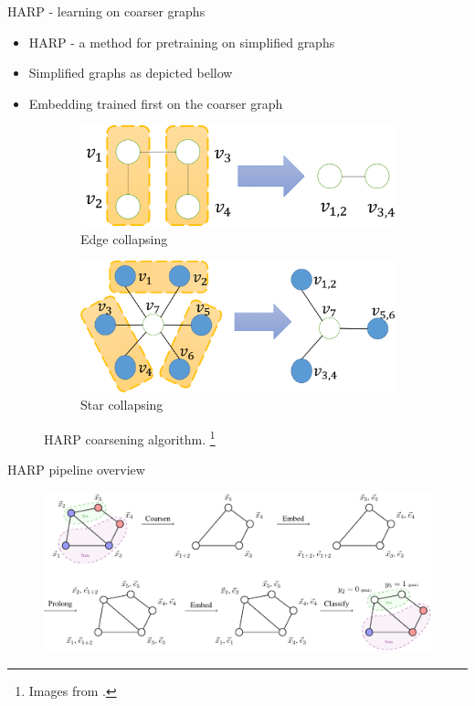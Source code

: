 \documentclass[10pt]{beamer}
\begin{document}
\begin{frame}{HARP - learning on coarser graphs}
	\begin{itemize}
		\item HARP - a method for pretraining on simplified graphs
		\item Simplified graphs as depicted bellow
		\item Embedding trained first on the coarser graph
	\end{itemize}
	\begin{figure}
		\centering
		\begin{subfigure}[t]{0.38\textwidth}
			\centering
			\includegraphics[width=\textwidth]{images/edge_collapsing.png}
			\caption{Edge collapsing}
		\end{subfigure}
		\hspace{2em}
		\begin{subfigure}[t]{0.38\textwidth}
			\centering
			\includegraphics[width=\textwidth]{images/star_collapsing.png}
			\caption{Star collapsing}
		\end{subfigure}
		\caption{HARP coarsening algorithm. \footnote{Images from \cite{chen_harp_2018}.}}
	\end{figure}
\end{frame}

\begin{frame}{HARP pipeline overview}
	\begin{figure}
		\centering
		\includegraphics[width=\textwidth]{images/harp-overview/harp-overview.pdf}
	\end{figure}
\end{frame}
\end{document}
